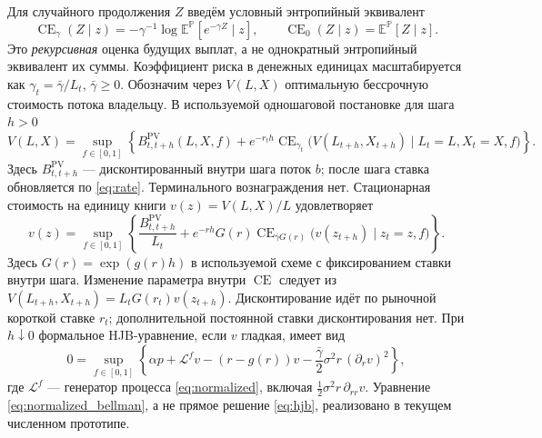 \documentclass[11pt,a4paper]{article}
\newcommand{\E}{\mathbb E}
\newcommand{\Pp}{\mathbb P}
\newcommand{\CE}{\operatorname{CE}}
\begin{document}
Для случайного продолжения $Z$ введём условный энтропийный
эквивалент
\[
 \CE_\gamma(Z\mid z)=
 -\gamma^{-1}\log\E^{\Pp}[e^{-\gamma Z}\mid z],
 \qquad \CE_0(Z\mid z)=\E^{\Pp}[Z\mid z].
\]
Это \emph{рекурсивная} оценка будущих выплат, а не однократный
энтропийный эквивалент их суммы. Коэффициент риска в денежных
единицах масштабируется как $\gamma_t=\bar\gamma/L_t$,
$\bar\gamma\geq0$. Обозначим через $V(L,X)$ оптимальную
бессрочную стоимость потока владельцу. В используемой одношаговой
постановке для шага $h>0$
\begin{equation}
 V(L,X)=\sup_{f\in[0,1]}
 \left\{B_{t,t+h}^{\mathrm{PV}}(L,X,f)
 +e^{-r_th}\CE_{\gamma_t}
   \bigl(V(L_{t+h},X_{t+h})\mid L_t=L,X_t=X,f\bigr)\right\}.
 \label{eq:bellman}
\end{equation}
Здесь $B_{t,t+h}^{\mathrm{PV}}$ --- дисконтированный внутри шага
поток $b$; после шага ставка обновляется по \eqref{eq:rate}.
Терминального вознаграждения нет. Стационарная стоимость на единицу
книги $v(z)=V(L,X)/L$ удовлетворяет
\begin{equation}
 v(z)=\sup_{f\in[0,1]}
 \left\{\frac{B_{t,t+h}^{\mathrm{PV}}}{L_t}
 +e^{-rh}G(r)
 \CE_{\bar\gamma G(r)}\!
 \bigl(v(z_{t+h})\mid z_t=z,f\bigr)\right\}.
 \label{eq:normalized_bellman}
\end{equation}
Здесь $G(r)=\exp(g(r)h)$ в используемой схеме с фиксированием
ставки внутри шага. Изменение параметра внутри $\CE$ следует из
$V(L_{t+h},X_{t+h})=L_tG(r_t)v(z_{t+h})$.
Дисконтирование идёт по рыночной короткой ставке $r_t$;
дополнительной постоянной ставки дисконтирования нет.
При $h\downarrow0$ формальное HJB-уравнение, если $v$ гладкая,
имеет вид
\begin{equation}
 0=\sup_{f\in[0,1]}
 \left\{\alpha p+\mathcal L^f v-(r-g(r))v
 -\frac{\bar\gamma}{2}\sigma^2r\,(\partial_r v)^2\right\},
 \label{eq:hjb}
\end{equation}
где $\mathcal L^f$ --- генератор процесса \eqref{eq:normalized},
включая $\tfrac12\sigma^2r\,\partial_{rr}v$.
Уравнение \eqref{eq:normalized_bellman}, а не прямое решение
\eqref{eq:hjb}, реализовано в текущем численном прототипе.
\end{document}

